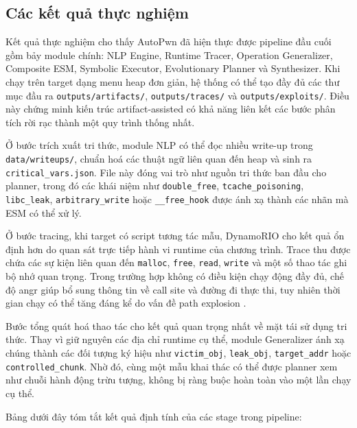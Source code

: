 \documentclass[final]{hcmuitthesis}
\begin{document}
\subsection{Các kết quả thực nghiệm}
Kết quả thực nghiệm cho thấy AutoPwn đã hiện thực được pipeline đầu cuối gồm bảy module chính: NLP Engine, Runtime Tracer, Operation Generalizer, Composite ESM, Symbolic Executor, Evolutionary Planner và Synthesizer. Khi chạy trên target dạng menu heap đơn giản, hệ thống có thể tạo đầy đủ các thư mục đầu ra \texttt{outputs/artifacts/}, \texttt{outputs/traces/} và \texttt{outputs/exploits/}. Điều này chứng minh kiến trúc artifact-assisted có khả năng liên kết các bước phân tích rời rạc thành một quy trình thống nhất.

Ở bước trích xuất tri thức, module NLP có thể đọc nhiều write-up trong \texttt{data/writeups/}, chuẩn hoá các thuật ngữ liên quan đến heap và sinh ra \texttt{critical\_vars.json}. File này đóng vai trò như nguồn tri thức ban đầu cho planner, trong đó các khái niệm như \texttt{double\_free}, \texttt{tcache\_poisoning}, \texttt{libc\_leak}, \texttt{arbitrary\_write} hoặc \texttt{\_\_free\_hook} được ánh xạ thành các nhãn mà ESM có thể xử lý.

Ở bước tracing, khi target có script tương tác mẫu, DynamoRIO cho kết quả ổn định hơn do quan sát trực tiếp hành vi runtime của chương trình. Trace thu được chứa các sự kiện liên quan đến \texttt{malloc}, \texttt{free}, \texttt{read}, \texttt{write} và một số thao tác ghi bộ nhớ quan trọng. Trong trường hợp không có điều kiện chạy động đầy đủ, chế độ angr giúp bổ sung thông tin về call site và đường đi thực thi, tuy nhiên thời gian chạy có thể tăng đáng kể do vấn đề path explosion \cite{dynamorio2025,angr2025}.

Bước tổng quát hoá thao tác cho kết quả quan trọng nhất về mặt tái sử dụng tri thức. Thay vì giữ nguyên các địa chỉ runtime cụ thể, module Generalizer ánh xạ chúng thành các đối tượng ký hiệu như \texttt{victim\_obj}, \texttt{leak\_obj}, \texttt{target\_addr} hoặc \texttt{controlled\_chunk}. Nhờ đó, cùng một mẫu khai thác có thể được planner xem như chuỗi hành động trừu tượng, không bị ràng buộc hoàn toàn vào một lần chạy cụ thể.

Bảng dưới đây tóm tắt kết quả định tính của các stage trong pipeline:
\end{document}
